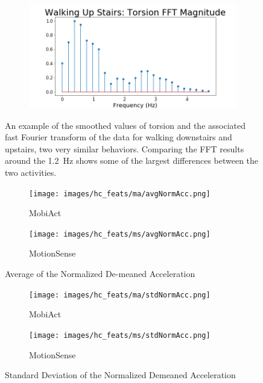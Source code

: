 \begin{figure}[ht]
\begin{subfigure}{.5\textwidth}
    \caption{}
    \label{fig:walkup_stor}
\end{subfigure}
\begin{subfigure}{.5\textwidth}
    \includegraphics[width = \textwidth]{images/smooth/Walking Up Stairs torsionFFT_ma.png}
    \caption{}
    \label{fig:walkup_tor_fft}
\end{subfigure}
\caption{An example of the smoothed values of torsion and the associated fast Fourier transform of the data for walking downstairs and upstairs, two very similar behaviors. Comparing the FFT results around the \SI{1.2 }{\Hz} shows some of the largest differences between the two activities.}
\label{fig:tor_smooth}
\end{figure}


\begin{figure}[ht]
\begin{subfigure}{.5\textwidth}
  \texttt{[image: images/hc\_feats/ma/avgNormAcc.png]}
    \caption{MobiAct}
    \label{fig:avg_norm_demeaned_acc_ma}
\end{subfigure}
\begin{subfigure}{.5\textwidth}
    \texttt{[image: images/hc\_feats/ms/avgNormAcc.png]}
    \caption{MotionSense}
    \label{fig:avg_norm_demeaned_acc_ms}
\end{subfigure}
\caption{Average of the Normalized De-meaned Acceleration}
\label{fig:avg_norm_demeaned_acc}
\end{figure}

\begin{figure}[ht]
\begin{subfigure}{.5\textwidth}
  \texttt{[image: images/hc\_feats/ma/stdNormAcc.png]}
    \caption{MobiAct}
    \label{fig:std_norm_demeaned_acc_ma}
\end{subfigure}
\begin{subfigure}{.5\textwidth}
    \texttt{[image: images/hc\_feats/ms/stdNormAcc.png]}
    \caption{MotionSense}
    \label{fig:std_norm_demeaned_acc_ms}
\end{subfigure}
\caption{Standard Deviation of the Normalized Demeaned Acceleration}
\label{fig:std_norm_demeaned_acc}
\end{figure}




